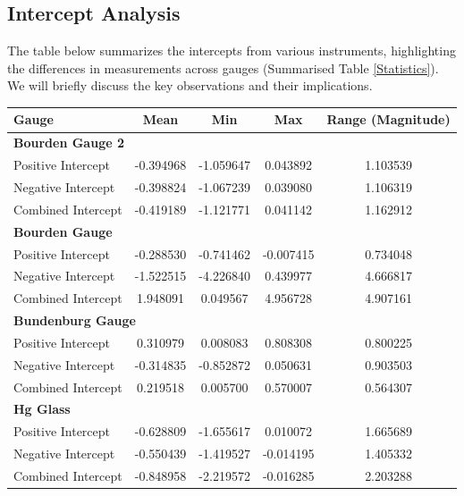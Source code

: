 \documentclass{article}
\begin{document}
\subsection{Intercept Analysis}
The table below summarizes the intercepts from various instruments, highlighting the differences in measurements across gauges (Summarised Table \ref{Statistics}). We will briefly discuss the key observations and their implications.
\begin{table}[H]
	\centering
	\begin{tabular}{lcccc}
		\toprule
		\textbf{Gauge} & \textbf{Mean} & \textbf{Min} & \textbf{Max} & \textbf{Range (Magnitude)} \\
		\midrule
		\multicolumn{5}{l}{\textbf{Bourden Gauge 2}} \\
		Positive Intercept & -0.394968 & -1.059647 & 0.043892 & 1.103539 \\
		Negative Intercept & -0.398824 & -1.067239 & 0.039080 & 1.106319 \\
		Combined Intercept & -0.419189 & -1.121771 & 0.041142 & 1.162912 \\
		\midrule
		\multicolumn{5}{l}{\textbf{Bourden Gauge}} \\
		Positive Intercept & -0.288530 & -0.741462 & -0.007415 & 0.734048 \\
		Negative Intercept & -1.522515 & -4.226840 & 0.439977 & 4.666817 \\
		Combined Intercept & 1.948091 & 0.049567 & 4.956728 & 4.907161 \\
		\midrule
		\multicolumn{5}{l}{\textbf{Bundenburg Gauge}} \\
		Positive Intercept & 0.310979 & 0.008083 & 0.808308 & 0.800225 \\
		Negative Intercept & -0.314835 & -0.852872 & 0.050631 & 0.903503 \\
		Combined Intercept & 0.219518 & 0.005700 & 0.570007 & 0.564307 \\
		\midrule
		\multicolumn{5}{l}{\textbf{Hg Glass}} \\
		Positive Intercept & -0.628809 & -1.655617 & 0.010072 & 1.665689 \\
		Negative Intercept & -0.550439 & -1.419527 & -0.014195 & 1.405332 \\
		Combined Intercept & -0.848958 & -2.219572 & -0.016285 & 2.203288 \\
		\bottomrule
	\end{tabular}
	\label{tab:intercept_analysis}
\end{table}
\end{document}

